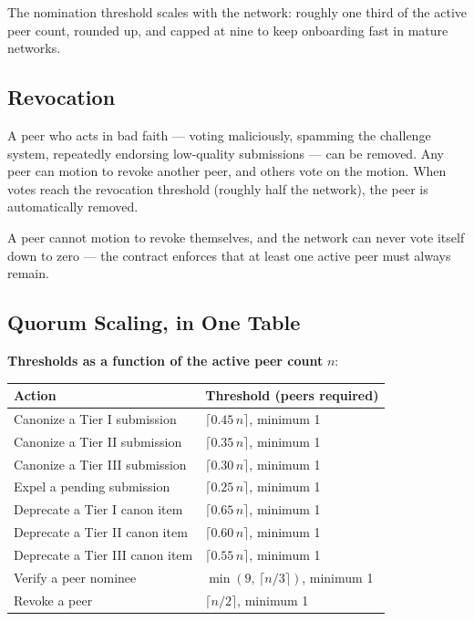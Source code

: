 \documentclass[11pt,a4paper]{article}
\begin{document}
The nomination threshold scales with the network: roughly one third
of the active peer count, rounded up, and capped at nine to keep
onboarding fast in mature networks.

\subsection{Revocation}

A peer who acts in bad faith --- voting maliciously, spamming the
challenge system, repeatedly endorsing low-quality submissions ---
can be removed. Any peer can motion to revoke another peer, and
others vote on the motion. When votes reach the revocation threshold
(roughly half the network), the peer is automatically removed.

A peer cannot motion to revoke themselves, and the network can never
vote itself down to zero --- the contract enforces that at least one
active peer must always remain.

\subsection{Quorum Scaling, in One Table}

\begin{plainbox}
\textbf{Thresholds as a function of the active peer count} $n$:
\vspace{0.3em}
\begin{tabular}{@{}p{6.5cm} p{8cm}@{}}
\textbf{Action}                                   & \textbf{Threshold (peers required)} \\
\midrule
Canonize a Tier I submission                      & $\lceil 0.45\, n \rceil$, minimum 1 \\
Canonize a Tier II submission                     & $\lceil 0.35\, n \rceil$, minimum 1 \\
Canonize a Tier III submission                    & $\lceil 0.30\, n \rceil$, minimum 1 \\
Expel a pending submission                        & $\lceil 0.25\, n \rceil$, minimum 1 \\
Deprecate a Tier I canon item                     & $\lceil 0.65\, n \rceil$, minimum 1 \\
Deprecate a Tier II canon item                    & $\lceil 0.60\, n \rceil$, minimum 1 \\
Deprecate a Tier III canon item                   & $\lceil 0.55\, n \rceil$, minimum 1 \\
Verify a peer nominee                             & $\min(9,\,\lceil n/3 \rceil)$, minimum 1 \\
Revoke a peer                                     & $\lceil n/2 \rceil$, minimum 1 \\
\end{tabular}
\end{plainbox}
\end{document}
